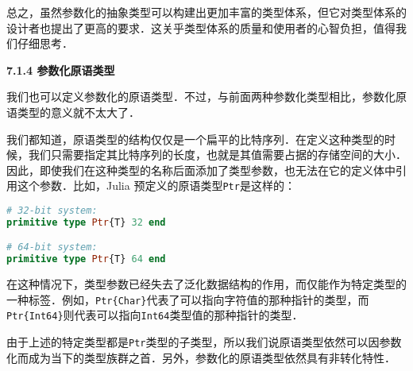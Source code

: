 总之，虽然参数化的抽象类型可以构建出更加丰富的类型体系，但它对类型体系的设计者也提出了更高的要求．这关乎类型体系的质量和使用者的心智负担，值得我们仔细思考．

\textbf{7.1.4 参数化原语类型}

我们也可以定义参数化的原语类型．不过，与前面两种参数化类型相比，参数化原语类型的意义就不太大了．

我们都知道，原语类型的结构仅仅是一个扁平的比特序列．在定义这种类型的时候，我们只需要指定其比特序列的长度，也就是其值需要占据的存储空间的大小．因此，即使我们在这种类型的名称后面添加了类型参数，也无法在它的定义体中引用这个参数．比如，Julia 预定义的原语类型\verb|Ptr|是这样的：
\begin{lstlisting}[language=julia]
# 32-bit system:
primitive type Ptr{T} 32 end

# 64-bit system:
primitive type Ptr{T} 64 end
\end{lstlisting}

在这种情况下，类型参数已经失去了泛化数据结构的作用，而仅能作为特定类型的一种标签．例如，\verb|Ptr{Char}|代表了可以指向字符值的那种指针的类型，而\verb|Ptr{Int64}|则代表可以指向\verb|Int64|类型值的那种指针的类型．

由于上述的特定类型都是\verb|Ptr|类型的子类型，所以我们说原语类型依然可以因参数化而成为当下的类型族群之首．另外，参数化的原语类型依然具有非转化特性．